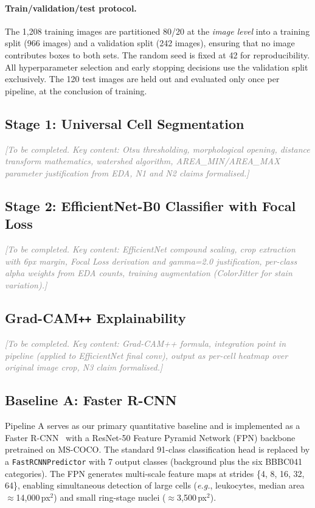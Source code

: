 \documentclass[10pt,twocolumn]{article}
\newcommand{\eg}{\textit{e.g.}}
\newcommand{\placeholder}[1]{\textcolor{gray}{\textit{#1}}}
\begin{document}
\paragraph{Train/validation/test protocol.}
The 1,208 training images are partitioned 80/20 at the \emph{image level}
into a training split (966 images) and a validation split (242 images),
ensuring that no image contributes boxes to both sets. The random seed is
fixed at 42 for reproducibility. All hyperparameter selection and early
stopping decisions use the validation split exclusively. The 120 test images
are held out and evaluated only once per pipeline, at the conclusion of
training.

\subsection{Stage 1: Universal Cell Segmentation}
\label{ssec:stage1}
\placeholder{[To be completed. Key content: Otsu thresholding, morphological opening, distance transform mathematics, watershed algorithm, AREA\_MIN/AREA\_MAX parameter justification from EDA, N1 and N2 claims formalised.]}

\subsection{Stage 2: EfficientNet-B0 Classifier with Focal Loss}
\label{ssec:stage2}
\placeholder{[To be completed. Key content: EfficientNet compound scaling, crop extraction with 6px margin, Focal Loss derivation and gamma=2.0 justification, per-class alpha weights from EDA counts, training augmentation (ColorJitter for stain variation).]}

\subsection{Grad-CAM\texttt{++} Explainability}
\label{ssec:gradcam}
\placeholder{[To be completed. Key content: Grad-CAM++ formula, integration point in pipeline (applied to EfficientNet final conv), output as per-cell heatmap over original image crop, N3 claim formalised.]}

\subsection{Baseline A: Faster R-CNN}
\label{ssec:baseline}

Pipeline A serves as our primary quantitative baseline and is implemented as
a Faster R-CNN~\cite{ren2015} with a ResNet-50 Feature Pyramid Network (FPN)
backbone pretrained on MS-COCO. The standard 91-class classification head is
replaced by a \texttt{FastRCNNPredictor} with 7 output classes (background
plus the six BBBC041 categories). The FPN generates multi-scale feature maps
at strides \{4, 8, 16, 32, 64\}, enabling simultaneous detection of large
cells (\eg, leukocytes, median area $\approx$14,000\,px$^2$) and small
ring-stage nuclei ($\approx$3,500\,px$^2$).
\end{document}
